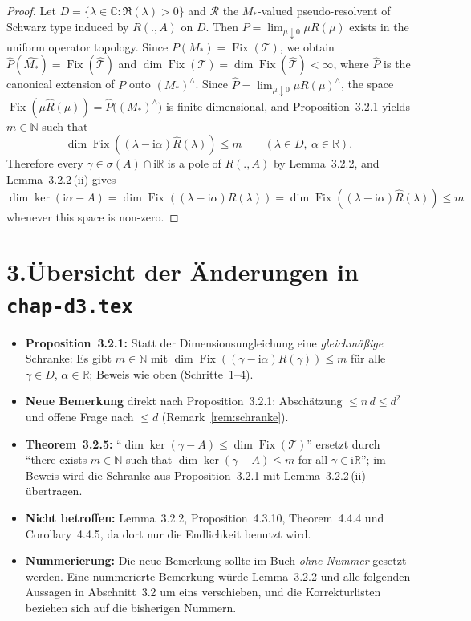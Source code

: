 \documentclass[11pt,a4paper]{article}
\theoremstyle{remark}
\newcommand{\R}{\mathbb{R}}
\newcommand{\C}{\mathbb{C}}
\newcommand{\N}{\mathbb{N}}
\newcommand{\im}{\mathrm{i}}
\newcommand{\1}{\mathbf{1}}
\newcommand{\RR}{\mathcal{R}}
\newcommand{\TT}{\mathcal{T}}
\newcommand{\Fix}[1]{\operatorname{Fix}(#1)}
\newcommand{\Kern}[1]{\ker(#1)}
\begin{document}
\begin{proof}
Let $D = \{\lambda \in \C \colon \Re(\lambda) > 0\}$ and $\RR$ the $M_{*}$-valued pseudo-resolvent of Schwarz type induced by $R(.,A)$ on $D$.
Then $P = \lim_{\mu \downarrow 0}\mu R(\mu)$ exists in the uniform operator topology.
Since $P(M_{*}) = \Fix{\TT}$, we obtain $\widehat{P}(\widehat{M_{*}}) = \Fix{\widehat{\TT}}$ and $\dim \Fix{\TT} = \dim \Fix{\widehat{\TT}} < \infty$, where $\widehat{P}$ is the canonical extension of\/ $P$ onto $(M_{*})^{\wedge}$.
Since $\widehat{P} = \lim_{\mu \downarrow 0} \mu R(\mu)^{\wedge}$, the space $\Fix{\mu\widehat{R}(\mu)} = \widehat{P}\bigl((M_{*})^{\wedge}\bigr)$ is finite dimensional, and Proposition~3.2.1 yields $m \in \N$ such that
\[
  \dim \Fix{(\lambda - \im\alpha)\widehat{R}(\lambda)} \le m \qquad (\lambda \in D,\ \alpha \in \R).
\]
Therefore every $\gamma \in \sigma(A) \cap \im\R$ is a pole of\/ $R(.,A)$ by Lemma~3.2.2, and Lemma~3.2.2\,(ii) gives $\dim\Kern{\im\alpha - A} = \dim \Fix{(\lambda - \im\alpha)R(\lambda)} = \dim \Fix{(\lambda - \im\alpha)\widehat{R}(\lambda)} \le m$ whenever this space is non-zero.
\end{proof}

\section*{3.\quad Übersicht der Änderungen in \texttt{chap-d3.tex}}

\begin{itemize}
\item \textbf{Proposition~3.2.1:} Statt der Dimensionsungleichung eine \emph{gleichmäßige} Schranke: Es gibt $m \in \N$ mit $\dim\Fix{(\gamma - \im\alpha)R(\gamma)} \le m$ für alle $\gamma \in D$, $\alpha \in \R$; Beweis wie oben (Schritte~1--4).
\item \textbf{Neue Bemerkung} direkt nach Proposition~3.2.1: Abschätzung $\le n\,d \le d^{2}$ und offene Frage nach $\le d$ (Remark~\ref{rem:schranke}).
\item \textbf{Theorem~3.2.5:} \enquote{$\dim\Kern{\gamma - A} \le \dim\Fix{\TT}$} ersetzt durch \enquote{there exists $m \in \N$ such that $\dim\Kern{\gamma - A} \le m$ for all $\gamma \in \im\R$}; im Beweis wird die Schranke aus Proposition~3.2.1 mit Lemma~3.2.2\,(ii) übertragen.
\item \textbf{Nicht betroffen:} Lemma~3.2.2, Proposition~4.3.10, Theorem~4.4.4 und Corollary~4.4.5, da dort nur die Endlichkeit benutzt wird.
\item \textbf{Nummerierung:} Die neue Bemerkung sollte im Buch \emph{ohne Nummer} gesetzt werden. Eine nummerierte Bemerkung würde Lemma~3.2.2 und alle folgenden Aussagen in Abschnitt~3.2 um eins verschieben, und die Korrekturlisten beziehen sich auf die bisherigen Nummern.
\end{itemize}
\end{document}

